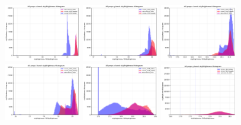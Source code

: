 \documentclass[DM,lsstdraft,authoryear,toc]{lsstdoc}
\begin{document}
\begin{figure}[ht]
\centering
\includegraphics[width=0.3\textwidth]{figures/skybrightness_u_band_ONED_ComboBinnedData}
\includegraphics[width=0.3\textwidth]{figures/skybrightness_g_band_ONED_ComboBinnedData}
\includegraphics[width=0.3\textwidth]{figures/skybrightness_r_band_ONED_ComboBinnedData} \\
\includegraphics[width=0.3\textwidth]{figures/skybrightness_i_band_ONED_ComboBinnedData}
\includegraphics[width=0.3\textwidth]{figures/skybrightness_z_band_ONED_ComboBinnedData}
\includegraphics[width=0.3\textwidth]{figures/skybrightness_y_band_ONED_ComboBinnedData}

\end{figure}
\end{document}

